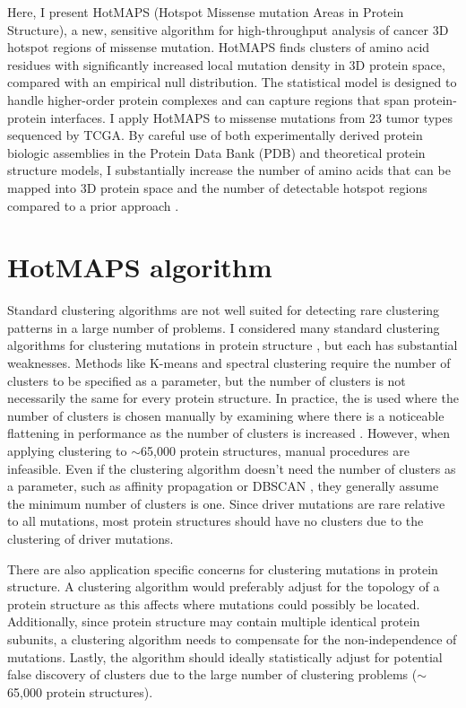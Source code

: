 Here, I present HotMAPS (Hotspot Missense mutation Areas in Protein Structure), a new, sensitive algorithm for high-throughput analysis of cancer 3D hotspot regions of missense mutation. HotMAPS finds clusters of amino acid residues with significantly increased local mutation density in 3D protein space, compared with an empirical null distribution. The statistical model is designed to handle higher-order protein complexes and can capture regions that span protein-protein interfaces. I apply HotMAPS to missense mutations from 23 tumor types sequenced by TCGA. By careful use of both experimentally derived protein biologic assemblies in the Protein Data Bank (PDB) and theoretical protein structure models, I substantially increase the number of amino acids that can be mapped into 3D protein space and the number of detectable hotspot regions compared to a prior approach \cite{RN105}.

\section{HotMAPS algorithm}

Standard clustering algorithms are not well suited for detecting rare clustering patterns in a large number of problems. I considered many standard clustering algorithms for clustering mutations in protein structure \cite{RN117, RN114, RN115, RN116}, but each has substantial weaknesses. Methods like K-means and spectral clustering require the number of clusters to be specified as a parameter, but the number of clusters is not necessarily the same for every protein structure. In practice, the  is used where the number of clusters is chosen manually by examining where there is a noticeable flattening in performance as the number of clusters is increased \cite{RN118}. However, when applying clustering to $\sim$65,000 protein structures, manual procedures are infeasible. Even if the clustering algorithm doesn't need the number of clusters as a parameter, such as affinity propagation \cite{RN114} or DBSCAN \cite{RN117}, they generally assume the minimum number of clusters is one. Since driver mutations are rare relative to all mutations, most protein structures should have no clusters due to the clustering of driver mutations.

There are also application specific concerns for clustering mutations in protein structure. A clustering algorithm would preferably adjust for the topology of a protein structure as this affects where mutations could possibly be located. Additionally, since protein structure may contain multiple identical protein subunits, a clustering algorithm needs to compensate for the non-independence of mutations. Lastly, the algorithm should ideally statistically adjust for potential false discovery of clusters due to the large number of clustering problems ($\sim$65,000 protein structures). 

